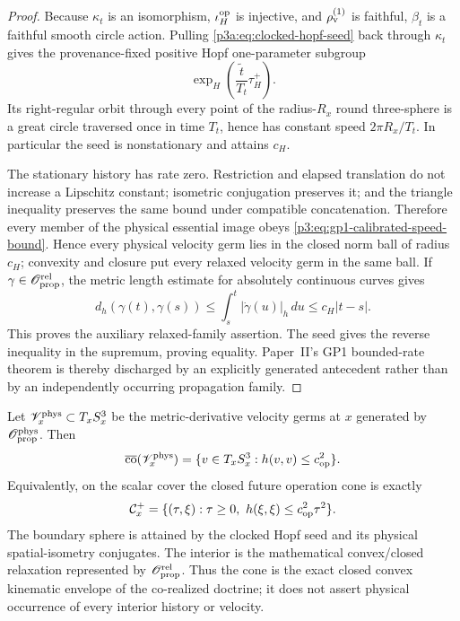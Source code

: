 \documentclass[12pt,a4paper]{article}
\begin{document}
\begin{proof}
Because \(\kappa_t\) is an isomorphism, \(\iota_H^{\rm op}\) is injective,
and \(\rho_{\rm v}^{(1)}\) is faithful, \(\beta_t\) is a faithful smooth circle
action.  Pulling \eqref{p3a:eq:clocked-hopf-seed} back through \(\kappa_t\)
gives the provenance-fixed positive Hopf one-parameter subgroup
\[
 \exp_H\!\left(\frac{\widetilde t}{T_t}\tau_H^+\right).
\]
Its right-regular orbit through every point of the radius-\(R_x\) round
three-sphere is a great circle traversed once in time \(T_t\), hence has
constant speed \(2\pi R_x/T_t\).  In particular the seed is nonstationary and
attains \(c_H\).

The stationary history has rate zero.  Restriction and elapsed translation do
not increase a Lipschitz constant; isometric conjugation preserves it; and
the triangle inequality preserves the same bound under compatible
concatenation.  Therefore every member of the physical essential image obeys
\eqref{p3:eq:gp1-calibrated-speed-bound}.  Hence every physical velocity germ
lies in the closed norm ball of radius \(c_H\); convexity and closure put every
relaxed velocity germ in the same ball.  If
\(\gamma\in\mathscr O_{\rm prop}^{\rm rel}\), the metric length estimate for
absolutely continuous curves gives
\[
 d_h(\gamma(t),\gamma(s))
 \le \int_s^t |\dot\gamma(u)|_h\,du
 \le c_H|t-s|.
\]
This proves the auxiliary relaxed-family assertion.  The seed gives
the reverse inequality in the supremum, proving equality.  Paper~II's GP1
bounded-rate theorem is thereby discharged by an explicitly generated
antecedent rather than by an independently occurring propagation family.
\end{proof}

\begin{corollary}
\label{p3:cor:gp1-round-causal-envelope}
Let \(\mathscr V_x^{\rm phys}\subset T_xS^3_x\) be the metric-derivative
velocity germs at \(x\) generated by
\(\mathscr O_{\rm prop}^{\rm phys}\).  Then
\[
 \overline{\operatorname{co}}(\mathscr V_x^{\rm phys})
 =\{v\in T_xS^3_x:h(v,v)\le c_{\rm op}^2\}.
\]
Equivalently, on the scalar cover the closed future operation cone is exactly
\[
 \mathcal C_x^+
 =\{(\tau,\xi):\tau\ge0,\ h(\xi,\xi)\le c_{\rm op}^2\tau^2\}.
\]
The boundary sphere is attained by the clocked Hopf seed and its physical
spatial-isometry conjugates.  The interior is the mathematical convex/closed
relaxation represented by \(\mathscr O_{\rm prop}^{\rm rel}\).  Thus the cone
is the exact closed convex kinematic envelope of the co-realized doctrine; it
does not assert physical occurrence of every interior history or velocity.
\end{corollary}
\end{document}
